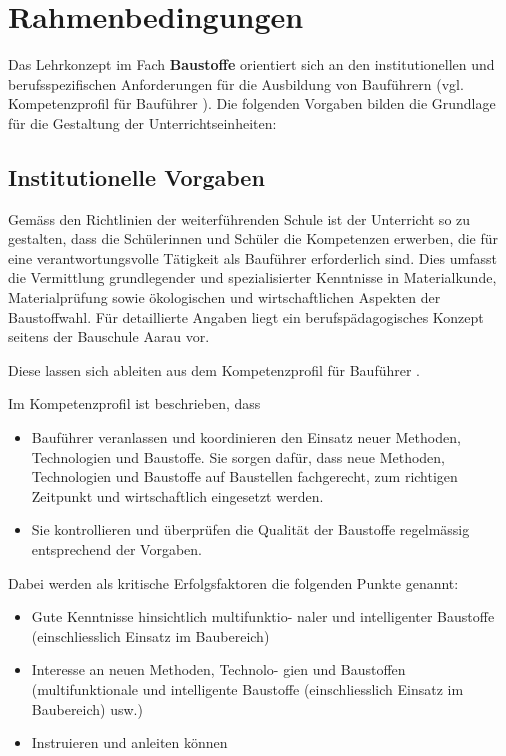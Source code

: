 \documentclass[
11pt,
captions=tableheading,
smallheadings,
headsepline,
footsepline, 
captions=tableheading,
parskip=half-,
]{scrartcl}
\begin{document}
\clearpage





\section{Rahmenbedingungen}


Das Lehrkonzept im Fach \textbf{Baustoffe} orientiert sich an den institutionellen und berufsspezifischen Anforderungen für die Ausbildung von Bauführern (vgl. Kompetenzprofil für Bauführer \cite{Kompetenzprofil_Baufuehrer}). Die folgenden Vorgaben bilden die Grundlage für die Gestaltung der Unterrichtseinheiten:

\subsection{Institutionelle Vorgaben}
Gemäss den Richtlinien der weiterführenden Schule ist der Unterricht so zu gestalten, dass die Schülerinnen und Schüler die Kompetenzen erwerben, die für eine verantwortungsvolle Tätigkeit als Bauführer erforderlich sind. Dies umfasst die Vermittlung grundlegender und spezialisierter Kenntnisse in Materialkunde, Materialprüfung sowie ökologischen und wirtschaftlichen Aspekten der Baustoffwahl. 
Für detaillierte Angaben liegt ein berufspädagogisches Konzept seitens der Bauschule Aarau vor.


Diese lassen sich ableiten aus dem Kompetenzprofil für Bauführer \cite{Kompetenzprofil_Baufuehrer}.

Im Kompetenzprofil ist beschrieben, dass 
\begin{itemize}
    \item Bauführer veranlassen und koordinieren den
    Einsatz neuer Methoden, Technologien und
    Baustoffe. Sie sorgen dafür, dass neue Methoden, Technologien und Baustoffe auf Baustellen fachgerecht, zum richtigen Zeitpunkt und wirtschaftlich eingesetzt werden.
    \item Sie kontrollieren und
    überprüfen die Qualität der Baustoffe regelmässig entsprechend der Vorgaben.
\end{itemize}

Dabei werden als kritische Erfolgsfaktoren die folgenden Punkte genannt:

\begin{itemize}
    \item Gute Kenntnisse hinsichtlich multifunktio-
    naler und intelligenter Baustoffe (einschliesslich Einsatz im Baubereich)
    \item Interesse an neuen Methoden, Technolo-
    gien und Baustoffen (multifunktionale und intelligente Baustoffe (einschliesslich Einsatz im Baubereich) usw.)
    \item Instruieren und anleiten können
\end{itemize}
\end{document}

